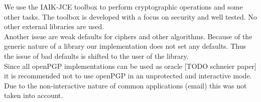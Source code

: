 We use the IAIK-JCE toolbox to perform cryptographic operations and some other tasks. The toolbox is developed with a focus on security and well tested. No other external libraries are used. \\

Another issue are weak defaults for ciphers and other algorithms. Because of the generic nature of a library our implementation does not set any defaults. Thus the issue of bad defaults is shifted to the user of the library. \\

Since all openPGP implementations can be used as oracle [TODO schneier paper] it is recommended not to use openPGP in an unprotected and interactive mode. Due to the non-interactive nature of common applications (email) this was not taken into account.







